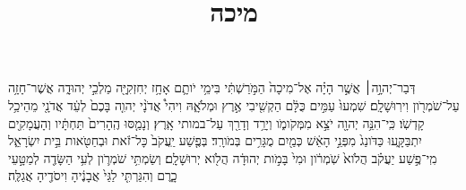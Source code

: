 \documentclass{openreader}
\title{מיכה}
\date{}
\begin{document}
\maketitle
\raggedbottom 
\fontsize{16pt}{24pt}\selectfont


דְּבַר־יְהוָ֣ה׀ אֲשֶׁ֣ר הָיָ֗ה אֶל־מִיכָה֙ הַמֹּ֣רַשְׁתִּ֔י בִּימֵ֥י יֹותָ֛ם אָחָ֥ז יְחִזְקִיָּ֖ה מַלְכֵ֣י יְהוּדָ֑ה אֲשֶׁר־חָזָ֥ה עַל־שֹׁמְרֹ֖ון וִירֽוּשָׁלִָֽם׃ 
שִׁמְעוּ֙ עַמִּ֣ים כֻּלָּ֔ם הַקְשִׁ֖יבִי אֶ֣רֶץ וּמְלֹאָ֑הּ וִיהִי֩ אֲדֹנָ֨י יְהוִ֤ה בָּכֶם֙ לְעֵ֔ד אֲדֹנָ֖י מֵהֵיכַ֥ל קָדְשֹֽׁו׃ 
כִּֽי־הִנֵּ֥ה יְהוָ֖ה יֹצֵ֣א מִמְּקֹומֹ֑ו וְיָרַ֥ד וְדָרַ֖ךְ עַל־במותי אָֽרֶץ׃ 
וְנָמַ֤סּוּ הֶֽהָרִים֙ תַּחְתָּ֔יו וְהָעֲמָקִ֖ים יִתְבַּקָּ֑עוּ כַּדֹּונַג֙ מִפְּנֵ֣י הָאֵ֔שׁ כְּמַ֖יִם מֻגָּרִ֥ים בְּמֹורָֽד׃ 
בְּפֶ֤שַׁע יַֽעֲקֹב֙ כָּל־זֹ֔את וּבְחַטֹּ֖אות בֵּ֣ית יִשְׂרָאֵ֑ל מִֽי־פֶ֣שַׁע יַעֲקֹ֗ב הֲלֹוא֙ שֹֽׁמְרֹ֔ון וּמִי֙ בָּמֹ֣ות יְהוּדָ֔ה הֲלֹ֖וא יְרוּשָׁלִָֽם׃ 
וְשַׂמְתִּ֥י שֹׁמְרֹ֛ון לְעִ֥י הַשָּׂדֶ֖ה לְמַטָּ֣עֵי כָ֑רֶם וְהִגַּרְתִּ֤י לַגַּי֙ אֲבָנֶ֔יהָ וִיסֹדֶ֖יהָ אֲגַלֶּֽה׃ 
\end{document}
